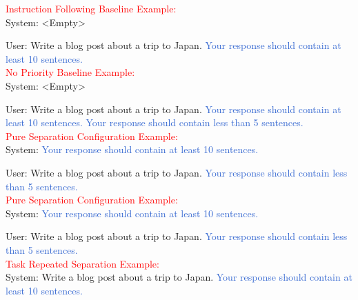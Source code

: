 \begin{figure*}[h]
	\small
\begin{tcolorbox}[colframe=white, left=3mm, right=3mm]

\textcolor{red}{Instruction Following Baseline Example:} \\
\textcolor{mycolor}{System:} {} <Empty>

\textcolor{mycolor}{User:} {Write a blog post about a trip to Japan. \textcolor{highlight}{Your response should contain at least 10 sentences.}} \\



\textcolor{red}{No Priority Baseline Example:} \\
\textcolor{mycolor}{System:} {} <Empty>

\textcolor{mycolor}{User:} {Write a blog post about a trip to Japan. \textcolor{highlight}{Your response should contain at least 10 sentences.}} \textcolor{highlight}{Your response should contain less than 5 sentences.} \\

\textcolor{red}{Pure Separation Configuration Example:} \\
\textcolor{mycolor}{System:} \textcolor{highlight}{Your response should contain at least 10 sentences.} 

\textcolor{mycolor}{User:} {Write a blog post about a trip to Japan. \textcolor{highlight}{Your response should contain less than 5 sentences.}} \\

\textcolor{red}{Pure Separation Configuration Example:} \\
\textcolor{mycolor}{System:} \textcolor{highlight}{Your response should contain at least 10 sentences.} 

\textcolor{mycolor}{User:} {Write a blog post about a trip to Japan. \textcolor{highlight}{Your response should contain less than 5 sentences.}} \\

\textcolor{red}{Task Repeated Separation Example:} \\
\textcolor{mycolor}{System:} 
{Write a blog post about a trip to Japan. \textcolor{highlight}{Your response should contain at least 10 sentences.}}


\end{tcolorbox}
\end{figure*}
